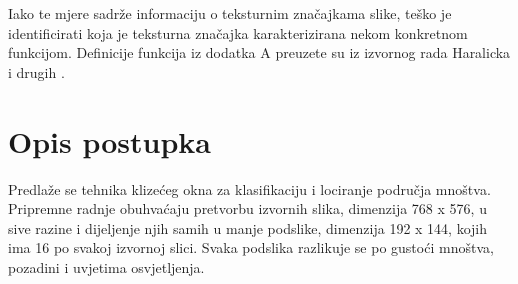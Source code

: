 \documentclass[times, utf8, zavrsni, numeric]{fer}
\begin{document}
\bigbreak

Iako te mjere sadrže informaciju o teksturnim značajkama slike, teško je identificirati koja je teksturna 
značajka karakterizirana nekom konkretnom funkcijom. Definicije funkcija iz dodatka A
preuzete su iz izvornog rada Haralicka i drugih \citep{haralick}.

\chapter{Opis postupka}

Predlaže se tehnika klizećeg okna za klasifikaciju i lociranje područja
mnoštva. Pripremne radnje obuhvaćaju pretvorbu izvornih slika, dimenzija
768 x 576, u sive razine i dijeljenje njih samih u manje podslike, dimenzija
192 x 144, kojih ima 16 po svakoj izvornoj slici. Svaka podslika razlikuje se 
po gustoći mnoštva, pozadini i uvjetima osvjetljenja.  
\end{document}
